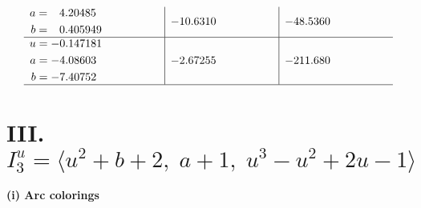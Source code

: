 \documentclass[1p]{elsarticle_modified}
\theoremstyle{definition}
\begin{document}
$$\begin{array}{c|c|c}
\begin{aligned}
a &= \phantom{-}4.20485\phantom{ +0.000000I} \\
b &= \phantom{-}0.405949\phantom{ +0.000000I}\end{aligned}
 & -10.6310\phantom{ +0.000000I} & -48.5360\phantom{ +0.000000I} \\ \hline\begin{aligned}
u &= -0.147181\phantom{ +0.000000I} \\
a &= -4.08603\phantom{ +0.000000I} \\
b &= -7.40752\phantom{ +0.000000I}\end{aligned}
 & -2.67255\phantom{ +0.000000I} & -211.680\phantom{ +0.000000I}\\
 \hline 
 \end{array}$$\newpage\newpage\renewcommand{\arraystretch}{1}
\centering \section*{III. $I^u_{3}= \langle u^2+b+2,\;a+1,\;u^3- u^2+2 u-1 \rangle$}
\flushleft \textbf{(i) Arc colorings}\\
\end{document}
